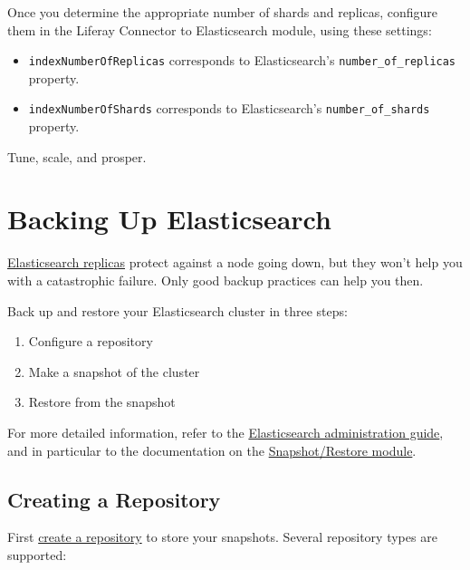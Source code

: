 Once you determine the appropriate number of shards and replicas,
configure them in the Liferay Connector to Elasticsearch module, using
these settings:

\begin{itemize}
\tightlist
\item
  \texttt{indexNumberOfReplicas} corresponds to Elasticsearch's
  \texttt{number\_of\_replicas} property.
\item
  \texttt{indexNumberOfShards} corresponds to Elasticsearch's
  \texttt{number\_of\_shards} property.
\end{itemize}

Tune, scale, and prosper.

\section{Backing Up Elasticsearch}\label{backing-up-elasticsearch}

\href{https://www.elastic.co/guide/en/elasticsearch/guide/master/replica-shards.html}{Elasticsearch
replicas} protect against a node going down, but they won't help you
with a catastrophic failure. Only good backup practices can help you
then.

Back up and restore your Elasticsearch cluster in three steps:

\begin{enumerate}
\def\labelenumi{\arabic{enumi}.}
\item
  Configure a repository
\item
  Make a snapshot of the cluster
\item
  Restore from the snapshot
\end{enumerate}

For more detailed information, refer to the
\href{https://www.elastic.co/guide/en/elasticsearch/guide/master/administration.html}{Elasticsearch
administration guide}, and in particular to the documentation on the
\href{https://www.elastic.co/guide/en/elasticsearch/reference/6.5/modules-snapshots.html}{Snapshot/Restore
module}.

\subsection{Creating a Repository}\label{creating-a-repository}

First
\href{https://www.elastic.co/guide/en/elasticsearch/reference/6.5/modules-snapshots.html\#_repositories}{create
a repository} to store your snapshots. Several repository types are
supported:

